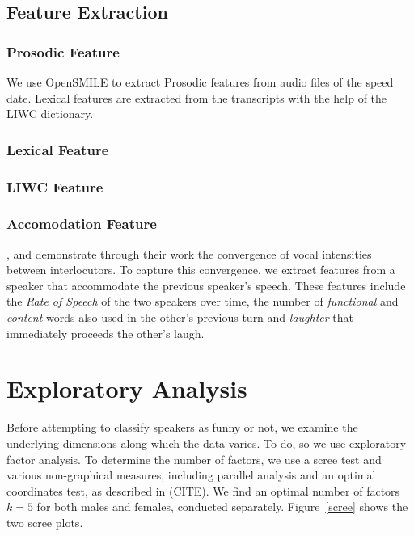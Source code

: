\documentclass[a4paper]{article}
\begin{document}
\subsection{Feature Extraction}

\subsubsection{Prosodic Feature}
We use OpenSMILE to extract Prosodic features from audio files of the speed date. Lexical features are extracted from the transcripts with the help of the LIWC dictionary.

\subsubsection{Lexical Feature}

\subsubsection{LIWC Feature}

\subsubsection{Accomodation Feature}
\cite{natale}, \cite{ireland} and \cite{levitan} demonstrate through their work the convergence of vocal intensities between interlocutors. To capture this convergence, we extract features from a speaker that accommodate the previous speaker's speech. These features include the \textit{Rate of Speech} of the two speakers over time, the number of \textit{functional} and \textit{content} words also used in the other's previous turn and \textit{laughter} that immediately proceeds the other's laugh.

\section{Exploratory Analysis}
Before attempting to classify speakers as funny or not, we examine the underlying dimensions along which the data varies.  To do, so we use exploratory factor analysis. To determine the number of factors, we use a scree test and various non-graphical measures, including parallel analysis and an optimal coordinates test, as described in (CITE).  We find an optimal number of factors $k = 5$ for both males and females, conducted separately.  Figure~\ref{scree} shows the two scree plots.
\end{document}
